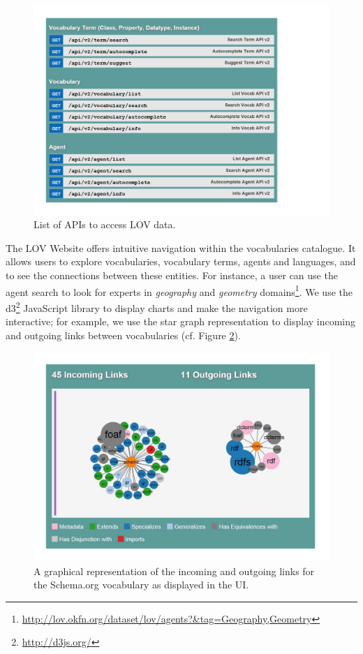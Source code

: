 \documentclass{iosart2c}
\begin{document}
\begin{figure}[!htb]
\includegraphics[trim={1cm 1cm 1cm 2cm},width=1.2\textwidth]{apis.pdf}
\caption{List of APIs to access LOV data.}
\label{fig:apis}
\end{figure}

The LOV Website offers intuitive navigation within the vocabularies catalogue. It allows users to explore vocabularies, vocabulary terms, agents and languages, and to see the connections between these entities. For instance, a user can use the agent search to look for experts in \emph{geography} and \emph{geometry} domains\footnote{\url{http://lov.okfn.org/dataset/lov/agents?&tag=Geography,Geometry}}. We use the d3\footnote{\url{http://d3js.org/}} JavaScript library to display charts and make the navigation more interactive; for example, we use the star graph representation to display incoming and outgoing links between vocabularies (cf. Figure \ref{fig:graphVocab}). 


\begin{figure}[ht!b]
\includegraphics[trim={1cm 1cm 1cm 1cm},width=1\textwidth]{graphVocab.pdf}
\caption{A graphical representation of the incoming and outgoing links for the Schema.org vocabulary as displayed in the UI.}
\label{fig:graphVocab}
\end{figure}
\end{document}
